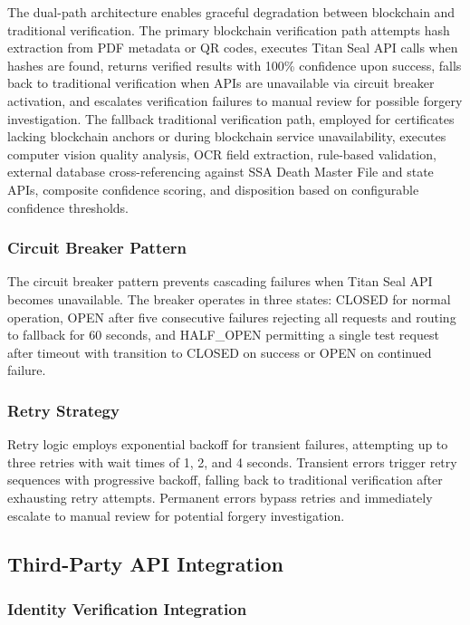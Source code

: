 The dual-path architecture enables graceful degradation between blockchain and traditional verification. The primary blockchain verification path attempts hash extraction from PDF metadata or QR codes, executes Titan Seal API calls when hashes are found, returns verified results with 100\% confidence upon success, falls back to traditional verification when APIs are unavailable via circuit breaker activation, and escalates verification failures to manual review for possible forgery investigation. The fallback traditional verification path, employed for certificates lacking blockchain anchors or during blockchain service unavailability, executes computer vision quality analysis, OCR field extraction, rule-based validation, external database cross-referencing against SSA Death Master File and state APIs, composite confidence scoring, and disposition based on configurable confidence thresholds.

\subsubsection{Circuit Breaker Pattern}

The circuit breaker pattern prevents cascading failures when Titan Seal API becomes unavailable. The breaker operates in three states: CLOSED for normal operation, OPEN after five consecutive failures rejecting all requests and routing to fallback for 60 seconds, and HALF_OPEN permitting a single test request after timeout with transition to CLOSED on success or OPEN on continued failure.

\subsubsection{Retry Strategy}

Retry logic employs exponential backoff for transient failures, attempting up to three retries with wait times of 1, 2, and 4 seconds. Transient errors trigger retry sequences with progressive backoff, falling back to traditional verification after exhausting retry attempts. Permanent errors bypass retries and immediately escalate to manual review for potential forgery investigation.

\subsection{Third-Party API Integration}

\subsubsection{Identity Verification Integration}

